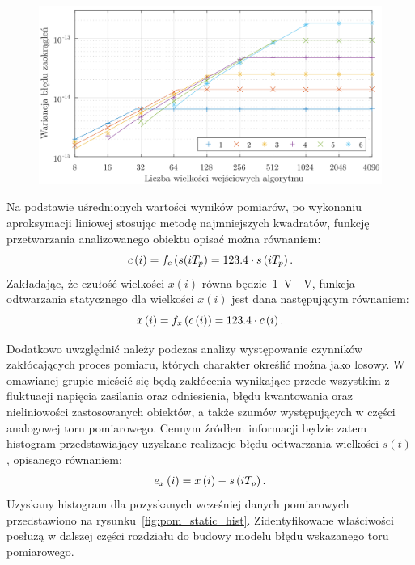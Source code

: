 \begin{figure}[htb!]
\begin{center}
\includegraphics{obrazki/dwt_rerror_coif5}
\end{center}
\end{figure}

Na podstawie uśrednionych wartości wyników pomiarów, po wykonaniu aproksymacji liniowej stosując metodę najmniejszych kwadratów, funkcję przetwarzania analizowanego obiektu opisać można równaniem:
\begin{equation}
c \left(i\right) = f_{c} \left(s(iT_{p}\right) = 123.4 \cdot s \left(iT_{p}\right) \label{eq:pom_func_static}.
\end{equation}
Zakładając, że czułość wielkości $x(i)$ równa będzie~\qty{1}{V \per V}, funkcja odtwarzania statycznego dla wielkości $x(i)$ jest dana następującym równaniem:
\begin{equation}
x \left(i\right) = f_{x} \left(c \left(i\right)\right) = 123.4 \cdot c \left(i\right) \label{eq:pom_funx_static}.
\end{equation}

Dodatkowo uwzględnić należy podczas analizy występowanie czynników zakłócających proces pomiaru, których charakter określić można jako losowy. W omawianej grupie mieścić się będą zakłócenia wynikające przede wszystkim z fluktuacji napięcia zasilania oraz odniesienia, błędu kwantowania oraz nieliniowości zastosowanych obiektów, a także szumów występujących w części analogowej toru pomiarowego. Cennym źródłem informacji będzie zatem histogram przedstawiający uzyskane realizacje błędu odtwarzania wielkości $s(t)$, opisanego równaniem:
\begin{equation}
e_{x} \left(i\right) = x \left(i\right) - s \left(iT_{p}\right) \label{eq:pom_funx_error}.
\end{equation}
Uzyskany histogram dla pozyskanych wcześniej danych pomiarowych przedstawiono na rysunku~\ref{fig:pom_static_hist}. Zidentyfikowane właściwości posłużą w dalszej części rozdziału do budowy modelu błędu wskazanego toru pomiarowego.

